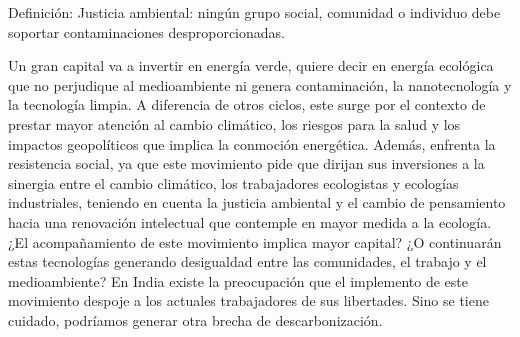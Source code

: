 \documentclass{article}
\begin{document}
\begin{footnotesize}
Definición: Justicia ambiental: ningún grupo social, comunidad o individuo debe soportar contaminaciones desproporcionadas.
\end{footnotesize}

Un gran capital va a invertir en energía verde, quiere decir en energía ecológica que no perjudique al medioambiente ni genera contaminación, la nanotecnología y la tecnología limpia. A diferencia de otros ciclos, este surge por el contexto de prestar mayor atención al cambio climático, los riesgos para la salud y los impactos geopolíticos que implica la conmoción energética. Además, enfrenta la resistencia social, ya que este movimiento pide que dirijan sus inversiones a la sinergia entre el cambio climático, los trabajadores ecologistas y ecologías industriales, teniendo en cuenta la justicia ambiental y el cambio de pensamiento hacia una renovación intelectual que contemple en mayor medida a la ecología. ¿El acompañamiento de este movimiento implica mayor capital? ¿O continuarán estas tecnologías generando desigualdad entre las comunidades, el trabajo y el medioambiente? En India existe la preocupación que el implemento de este movimiento despoje a los actuales trabajadores de sus libertades. Sino se tiene cuidado, podríamos generar otra brecha de descarbonización.
\end{document}
